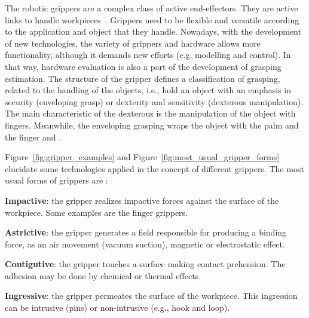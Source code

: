 The robotic grippers are a complex class of active end-effectors. They are active links to handle workpieces~\cite{monkman2007robot}. Grippers need to be flexible and versatile according to the application and object that they handle. Nowadays, with the development of new technologies, the variety of grippers and hardware allows more functionality, although it demands new efforts (e.g. modelling and control). In that way, hardware evaluation is also a part of the development of grasping estimation. The structure of the gripper defines a classification of grasping, related to the handling of the objects, i.e., hold an object with an emphasis in security (enveloping grasp) or dexterity and sensitivity (dexterous manipulation). The main characteristic of the dexterous is the manipulation of the object with fingers. Meanwhile, the enveloping grasping wraps the object with the palm and the finger \cite{Bicchi2000} and \cite{alonso2018current}.


Figure~\ref{fig:gripper_examples} and Figure~\ref{fig:most_usual_gripper_forms} elucidate some technologies applied in the concept of different
grippers. The most usual forms of grippers are \cite{monkman2007robot}:

\begin{itemize_jp}
    \item \textbf{Impactive}: the gripper realizes impactive forces against the surface of the workpiece. Some examples are the finger grippers.
    
    \item \textbf{Astrictive}: the gripper generates a field responsible for producing a binding force, as an air movement (vacuum suction), magnetic or electrostatic effect.
    
    \item \textbf{Contigutive}: the gripper touches a surface making contact prehension. The adhesion may be done by chemical or thermal effects.
    
    \item \textbf{Ingressive}: the gripper permeates the surface of the workpiece. This ingression can be intrusive (pins) or non-intrusive (e.g., hook and loop).    
\end{itemize_jp}

